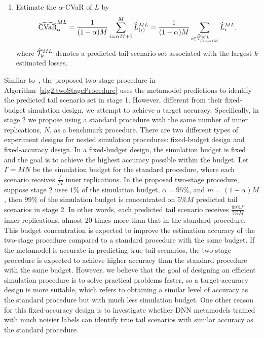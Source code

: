 \begin{algorithm}
\begin{algorithmic}[1]
\begin{enumerate} [label=\alph*., itemsep=0pt, parsep=0pt, topsep=0pt]
        \item Estimate the $\alpha$-CVaR of $L$ by 
        $$\widehat{\mbox{CVaR}}^{ML}_\alpha = \frac{1}{(1-\alpha)M} \sum_{i=\alpha M + 1}^{M}\widehat{L}_{(i)}^{ML} = \frac{1}{(1-\alpha)M} \sum_{i \in \widehat{\mathcal{T}}_{(1-\alpha )M}^{ML}}\widehat{L}_{i}^{ML},$$ 
        where $\widehat{\mathcal{T}}_{k}^{ML}$ denotes a predicted tail scenario set associated with the largest $k$ estimated losses.
    \end{enumerate}
\end{algorithmic}
\end{algorithm}

Similar to~\cite{dang2020efficient}, the proposed two-stage procedure in Algorithm~\ref{alg2:twoStageProcedure} uses the metamodel predictions to identify the predicted tail scenario set in stage 1.
However, different from their fixed-budget simulation design, we attempt to achieve a target accuracy.
Specifically, in stage 2 we propose using a standard procedure with the same number of inner replications, $N$, as a benchmark procedure.
There are two different types of experiment designs for nested simulation procedures: fixed-budget design and fixed-accuracy design.
In a fixed-budget design, the simulation budget is fixed and the goal is to achieve the highest accuracy possible within the budget.
Let $\Gamma = MN$ be the simulation budget for the standard procedure, where each scenario receives $\frac{\Gamma}{M}$ inner replications.
In the proposed two-stage procedure, suppose stage 2 uses $1\%$ of the simulation budget, $\alpha = 95\%$, and $m=(1-\alpha)M$, then $99\%$ of the simulation budget is concentrated on $5\% M$ predicted tail scenarios in stage 2.
In other words, each predicted tail scenario receives $\frac{99\% \Gamma}{5\% M}$ inner replications, almost 20 times more than that in the standard procedure.
This budget concentration is expected to improve the estimation accuracy of the two-stage procedure compared to a standard procedure with the same budget. 
If the metamodel is accurate in predicting true tail scenarios, the two-stage procedure is expected to achieve higher accuracy than the standard procedure with the same budget.
However, we believe that the goal of designing an efficient simulation procedure is to solve practical problems faster, so a target-accuracy design is more suitable, which refers to obtaining a similar level of accuracy as the standard procedure but with much less simulation budget.
One other reason for this fixed-accuracy design is to investigate whether DNN metamodels trained with much noisier labels can identify true tail scenarios with similar accuracy as the standard procedure.
